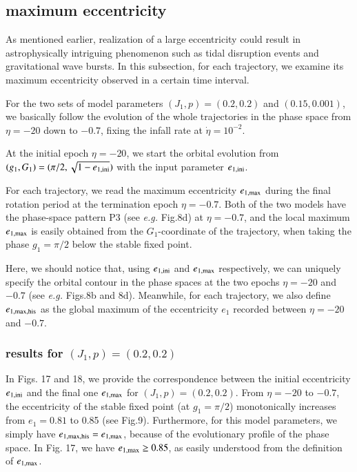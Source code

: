 \documentclass[useAMS,usenatbib,twocolumn]{mn2e}
\newcommand{\beqa}{\begin{eqnarray}}
\newcommand{\eeqa}{\end{eqnarray}}
\begin{document}


\subsection{maximum eccentricity} 




As mentioned earlier, realization of a large eccentricity could result in  astrophysically intriguing phenomenon such as  tidal disruption events and gravitational wave bursts. In this subsection, for each trajectory,  we examine its maximum eccentricity observed in a certain time interval. 

For the two sets of model parameters $(J_1,p)=(0.2,0.2)$ and $(0.15,0.001)$, we basically follow the evolution of the whole trajectories in the phase space from  $\eta=-20$ down to  $-0.7$,  fixing the infall rate at $\dot{\eta}=10^{-2}$. 

At the initial epoch $\eta=-20$, we start the orbital evolution from $(g_1,G_1)=(\pi/2, \sqrt{1-e_{\rm 1,ini}})$ with the input parameter $e_{\rm 1,ini}$.   


For each trajectory,  we read the maximum eccentricity  $e_{\rm 1,max}$ during the final rotation period at the termination epoch $\eta=-0.7$.  Both of  the two models have the phase-space pattern P3 (see {\it e.g.} Fig.8d) at $\eta=-0.7$, and the local maximum $e_{\rm 1,max}$ is  easily obtained from  the $G_1$-coordinate of the trajectory,   when taking the phase $g_1=\pi/2$  below the stable fixed point. 



Here, we should notice that, using  $e_{\rm 1,ini}$ and  $e_{\rm 1,max}$ respectively, we can uniquely specify the orbital contour in the phase spaces at the two epochs $\eta=-20$ and $-0.7$ (see {\it e.g.} Figs.8b and 8d).  Meanwhile, for each trajectory,  we also define  $e_{\rm 1,max,his}$ as the global maximum  of the eccentricity $e_1$  recorded between $\eta=-20$ and $-0.7$. 


\subsubsection{results for $(J_1,p)=(0.2,0.2)$}




In Figs. 17 and 18,  we provide the correspondence  between the initial eccentricity $e_{\rm 1,ini}$ and the final one  $e_{\rm 1,max}$ for $(J_1,p)=(0.2,0.2)$.
From $\eta=-20$ to $-0.7$, the eccentricity of the stable fixed point (at $g_1=\pi/2$) monotonically increases from $e_1=0.81$ to 0.85  (see Fig.9).  Furthermore, for this model parameters, we simply have 
$e_{\rm 1,max,his}=e_{\rm 1,max}$, because of the evolutionary profile of the phase space.  In Fig. 17, we have $e_{\rm 1,max}\ge0.85$, as easily understood from the definition of $e_{\rm 1,max}$. 
\end{document}
